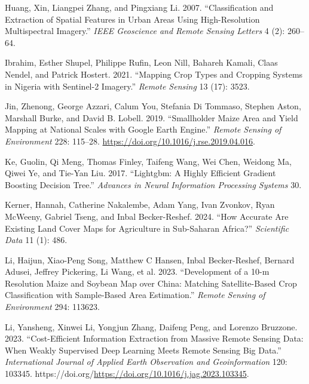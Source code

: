 \documentclass[
  journal,
  twocolumn]{IEEEtran}
\newlength{\cslhangindent}
\newlength{\cslentryspacingunit} %
\newenvironment{CSLReferences}[2] %
 {%
  \setlength{\parindent}{0pt}
  \ifodd #1
  \let\oldpar\par
  \def\par{\hangindent=\cslhangindent\oldpar}
  \fi
  \setlength{\parskip}{#2\cslentryspacingunit}
 }%
 {}
\begin{document}
\begin{CSLReferences}{1}{0}
\leavevmode{}%
Huang, Xin, Liangpei Zhang, and Pingxiang Li. 2007. {``Classification
and Extraction of Spatial Features in Urban Areas Using High-Resolution
Multispectral Imagery.''} \emph{IEEE Geoscience and Remote Sensing
Letters} 4 (2): 260--64.

\leavevmode{}%
Ibrahim, Esther Shupel, Philippe Rufin, Leon Nill, Bahareh Kamali, Claas
Nendel, and Patrick Hostert. 2021. {``Mapping Crop Types and Cropping
Systems in Nigeria with Sentinel-2 Imagery.''} \emph{Remote Sensing} 13
(17): 3523.

\leavevmode{}%
Jin, Zhenong, George Azzari, Calum You, Stefania Di Tommaso, Stephen
Aston, Marshall Burke, and David B. Lobell. 2019. {``Smallholder Maize
Area and Yield Mapping at National Scales with Google Earth Engine.''}
\emph{Remote Sensing of Environment} 228: 115--28.
\url{https://doi.org/10.1016/j.rse.2019.04.016}.

\leavevmode{}%
Ke, Guolin, Qi Meng, Thomas Finley, Taifeng Wang, Wei Chen, Weidong Ma,
Qiwei Ye, and Tie-Yan Liu. 2017. {``Lightgbm: A Highly Efficient
Gradient Boosting Decision Tree.''} \emph{Advances in Neural Information
Processing Systems} 30.

\leavevmode{}%
Kerner, Hannah, Catherine Nakalembe, Adam Yang, Ivan Zvonkov, Ryan
McWeeny, Gabriel Tseng, and Inbal Becker-Reshef. 2024. {``How Accurate
Are Existing Land Cover Maps for Agriculture in Sub-Saharan Africa?''}
\emph{Scientific Data} 11 (1): 486.

\leavevmode{}%
Li, Haijun, Xiao-Peng Song, Matthew C Hansen, Inbal Becker-Reshef,
Bernard Adusei, Jeffrey Pickering, Li Wang, et al. 2023. {``Development
of a 10-m Resolution Maize and Soybean Map over China: Matching
Satellite-Based Crop Classification with Sample-Based Area
Estimation.''} \emph{Remote Sensing of Environment} 294: 113623.

\leavevmode{}%
Li, Yansheng, Xinwei Li, Yongjun Zhang, Daifeng Peng, and Lorenzo
Bruzzone. 2023. {``Cost-Efficient Information Extraction from Massive
Remote Sensing Data: When Weakly Supervised Deep Learning Meets Remote
Sensing Big Data.''} \emph{International Journal of Applied Earth
Observation and Geoinformation} 120: 103345.
https://doi.org/\url{https://doi.org/10.1016/j.jag.2023.103345}.


\end{CSLReferences}
\end{document}
